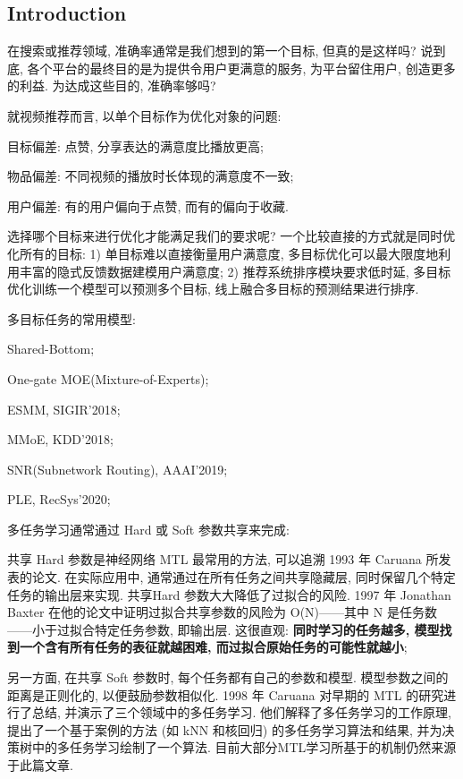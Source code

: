 \subsection{Introduction}
在搜索或推荐领域, 准确率通常是我们想到的第一个目标, 但真的是这样吗? 说到底, 各个平台的最终目的是为提供令用户更满意的服务, 为平台留住用户, 创造更多的利益. 为达成这些目的, 准确率够吗?

就视频推荐而言, 以单个目标作为优化对象的问题:
\begin{myitemize}
	\item 目标偏差: 点赞, 分享表达的满意度比播放更高;
	
	\item 物品偏差: 不同视频的播放时长体现的满意度不一致;
	
	\item 用户偏差: 有的用户偏向于点赞, 而有的偏向于收藏.
\end{myitemize}

选择哪个目标来进行优化才能满足我们的要求呢? 一个比较直接的方式就是同时优化所有的目标: 1) 单目标难以直接衡量用户满意度, 多目标优化可以最大限度地利用丰富的隐式反馈数据建模用户满意度; 2) 推荐系统排序模块要求低时延, 多目标优化训练一个模型可以预测多个目标, 线上融合多目标的预测结果进行排序.


多目标任务的常用模型: 
\begin{myitemize}
	\item Shared-Bottom;
	\item One-gate MOE(Mixture-of-Experts);
	\item ESMM, SIGIR'2018;
	\item MMoE, KDD'2018;
	
	\item SNR(Subnetwork Routing), AAAI'2019;
	\item PLE, RecSys'2020;
\end{myitemize}

多任务学习通常通过 Hard 或 Soft 参数共享来完成: 
\begin{myitemize}
	\item 共享 Hard 参数是神经网络 MTL 最常用的方法, 可以追溯 1993 年 Caruana 所发表的论文. 在实际应用中, 通常通过在所有任务之间共享隐藏层, 同时保留几个特定任务的输出层来实现. 共享Hard 参数大大降低了过拟合的风险. 1997 年 Jonathan Baxter 在他的论文中证明过拟合共享参数的风险为 O(N)——其中 N 是任务数——小于过拟合特定任务参数, 即输出层. 这很直观: \textbf{同时学习的任务越多, 模型找到一个含有所有任务的表征就越困难, 而过拟合原始任务的可能性就越小};
	
	\item 另一方面, 在共享 Soft 参数时, 每个任务都有自己的参数和模型. 模型参数之间的距离是正则化的, 以便鼓励参数相似化. 1998 年 Caruana 对早期的 MTL 的研究进行了总结, 并演示了三个领域中的多任务学习. 他们解释了多任务学习的工作原理, 提出了一个基于案例的方法 (如 kNN 和核回归) 的多任务学习算法和结果, 并为决策树中的多任务学习绘制了一个算法. 目前大部分MTL学习所基于的机制仍然来源于此篇文章.
\end{myitemize}
 

